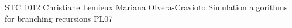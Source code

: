 	{STC 1012}	%
	{Christiane Lemieux}		%
	{Mariana Olvera-Cravioto}	%
	{Simulation algorithms for branching recursions}		%
	{PL07}			%
	\\\hline
